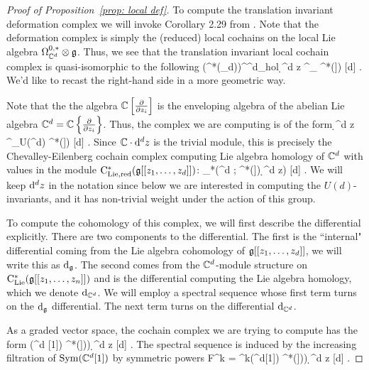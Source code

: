\begin{proof}[Proof of Proposition~\ref{prop: local def}]
To compute the translation invariant deformation complex we will invoke Corollary 2.29 from \cite{BWhol}. 
Note that the deformation complex is simply the (reduced) local cochains on the local Lie algebra $\Omega^{0,*}_{\mathbb C^d} \otimes \mathfrak g$. 
Thus, we see that the translation invariant local cochain complex is quasi-isomorphic to the following
\beqn
\left(\cloc^*(\sG_d)\right)^{\CC^{d}_{\rm hol}} \; \simeq \; \CC \cdot \d^d z \tensor^{\LL}_{\CC{}} \cred^*(\fg[[z_1,\ldots,z_d]])  [d] .
\eeqn
We'd like to recast the right-hand side in a more geometric way. 

Note that the the algebra $\mathbb C\left[\frac{\partial}{\partial z_i}\right]$ is the enveloping algebra of the abelian Lie algebra $\mathbb C^d = \mathbb C\left\{\frac{\partial}{\partial z_i}\right\}$. 
Thus, the complex we are computing is of the form
\beqn
\CC \cdot \d^d z \tensor^{\LL}_{U(\CC^d)} \cred^*(\fg[[z_1,\ldots,z_d]]) [d] .
\eeqn
Since $\mathbb C \cdot {\rm d}^d z$ is the trivial module, this is precisely the Chevalley-Eilenberg cochain complex computing Lie algebra homology of $\mathbb C^d$ with values in the module ${\rm C}_{\rm Lie, red}^*(\mathfrak g[[z_1,\ldots,z_d]])$:
\beqn
\clieu_*\left(\CC^d ; \cred^*(\fg[[z_1,\ldots,z_d]]) \d^d z\right) [d] .
\eeqn
We will keep ${\rm d}^d z$ in the notation since below we are interested in computing the $U(d)$-invariants, and it has non-trivial weight under the action of this group.

To compute the cohomology of this complex, we will first describe the differential explicitly. 
There are two components to the differential.
The first is the ``internal" differential coming from the Lie algebra cohomology of $\mathfrak g [[z_1,\ldots,z_d]]$, we will write this as ${\rm d}_{\mathfrak g}$. 
The second comes from the $\mathbb C^d$-module structure on ${\rm C}_{{\rm Lie}}^*(\mathfrak g[[z_1,\ldots,z_n]])$ and is the differential computing the Lie algebra homology, which we denote ${\rm d}_{\mathbb C^d}$. 
We will employ a spectral sequence whose first term turns on the ${\rm d}_{\mathfrak g}$ differential.
The next term turns on the differential ${\rm d}_{\mathbb C^d}$.

As a graded vector space, the cochain complex we are trying to compute has the form
\beqn
\Sym(\CC^d [1]) \tensor \cred^*\left(\fg[[z_1,\ldots,z_d]])\right) \d^d z [d] .
\eeqn
The spectral sequence is induced by the increasing filtration of ${\rm Sym}(\mathbb C^d [1])$ by symmetric powers
\beqn
F^k = \Sym^{\leq k}(\CC^d[1]) \tensor \cred^*\left(\fg[[z_1,\ldots,z_d]])\right) \d^d z [d] .
\eeqn


\end{proof}
